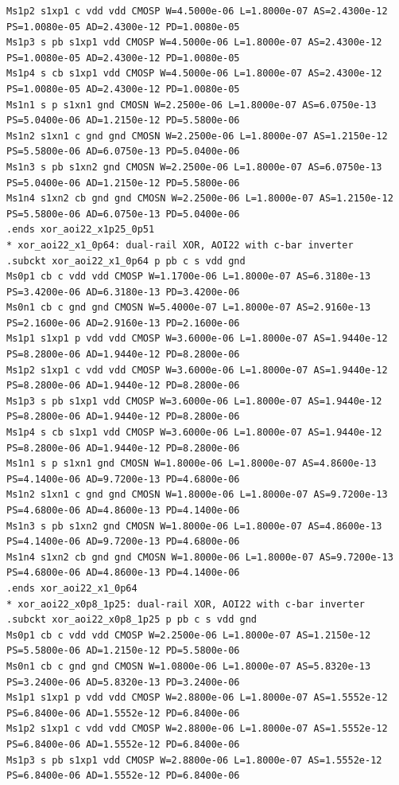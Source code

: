 \documentclass[10pt,a4paper]{article}
\begin{document}
{\begin{verbatim}
Ms1p2 s1xp1 c vdd vdd CMOSP W=4.5000e-06 L=1.8000e-07 AS=2.4300e-12 PS=1.0080e-05 AD=2.4300e-12 PD=1.0080e-05
Ms1p3 s pb s1xp1 vdd CMOSP W=4.5000e-06 L=1.8000e-07 AS=2.4300e-12 PS=1.0080e-05 AD=2.4300e-12 PD=1.0080e-05
Ms1p4 s cb s1xp1 vdd CMOSP W=4.5000e-06 L=1.8000e-07 AS=2.4300e-12 PS=1.0080e-05 AD=2.4300e-12 PD=1.0080e-05
Ms1n1 s p s1xn1 gnd CMOSN W=2.2500e-06 L=1.8000e-07 AS=6.0750e-13 PS=5.0400e-06 AD=1.2150e-12 PD=5.5800e-06
Ms1n2 s1xn1 c gnd gnd CMOSN W=2.2500e-06 L=1.8000e-07 AS=1.2150e-12 PS=5.5800e-06 AD=6.0750e-13 PD=5.0400e-06
Ms1n3 s pb s1xn2 gnd CMOSN W=2.2500e-06 L=1.8000e-07 AS=6.0750e-13 PS=5.0400e-06 AD=1.2150e-12 PD=5.5800e-06
Ms1n4 s1xn2 cb gnd gnd CMOSN W=2.2500e-06 L=1.8000e-07 AS=1.2150e-12 PS=5.5800e-06 AD=6.0750e-13 PD=5.0400e-06
.ends xor_aoi22_x1p25_0p51
* xor_aoi22_x1_0p64: dual-rail XOR, AOI22 with c-bar inverter
.subckt xor_aoi22_x1_0p64 p pb c s vdd gnd
Ms0p1 cb c vdd vdd CMOSP W=1.1700e-06 L=1.8000e-07 AS=6.3180e-13 PS=3.4200e-06 AD=6.3180e-13 PD=3.4200e-06
Ms0n1 cb c gnd gnd CMOSN W=5.4000e-07 L=1.8000e-07 AS=2.9160e-13 PS=2.1600e-06 AD=2.9160e-13 PD=2.1600e-06
Ms1p1 s1xp1 p vdd vdd CMOSP W=3.6000e-06 L=1.8000e-07 AS=1.9440e-12 PS=8.2800e-06 AD=1.9440e-12 PD=8.2800e-06
Ms1p2 s1xp1 c vdd vdd CMOSP W=3.6000e-06 L=1.8000e-07 AS=1.9440e-12 PS=8.2800e-06 AD=1.9440e-12 PD=8.2800e-06
Ms1p3 s pb s1xp1 vdd CMOSP W=3.6000e-06 L=1.8000e-07 AS=1.9440e-12 PS=8.2800e-06 AD=1.9440e-12 PD=8.2800e-06
Ms1p4 s cb s1xp1 vdd CMOSP W=3.6000e-06 L=1.8000e-07 AS=1.9440e-12 PS=8.2800e-06 AD=1.9440e-12 PD=8.2800e-06
Ms1n1 s p s1xn1 gnd CMOSN W=1.8000e-06 L=1.8000e-07 AS=4.8600e-13 PS=4.1400e-06 AD=9.7200e-13 PD=4.6800e-06
Ms1n2 s1xn1 c gnd gnd CMOSN W=1.8000e-06 L=1.8000e-07 AS=9.7200e-13 PS=4.6800e-06 AD=4.8600e-13 PD=4.1400e-06
Ms1n3 s pb s1xn2 gnd CMOSN W=1.8000e-06 L=1.8000e-07 AS=4.8600e-13 PS=4.1400e-06 AD=9.7200e-13 PD=4.6800e-06
Ms1n4 s1xn2 cb gnd gnd CMOSN W=1.8000e-06 L=1.8000e-07 AS=9.7200e-13 PS=4.6800e-06 AD=4.8600e-13 PD=4.1400e-06
.ends xor_aoi22_x1_0p64
* xor_aoi22_x0p8_1p25: dual-rail XOR, AOI22 with c-bar inverter
.subckt xor_aoi22_x0p8_1p25 p pb c s vdd gnd
Ms0p1 cb c vdd vdd CMOSP W=2.2500e-06 L=1.8000e-07 AS=1.2150e-12 PS=5.5800e-06 AD=1.2150e-12 PD=5.5800e-06
Ms0n1 cb c gnd gnd CMOSN W=1.0800e-06 L=1.8000e-07 AS=5.8320e-13 PS=3.2400e-06 AD=5.8320e-13 PD=3.2400e-06
Ms1p1 s1xp1 p vdd vdd CMOSP W=2.8800e-06 L=1.8000e-07 AS=1.5552e-12 PS=6.8400e-06 AD=1.5552e-12 PD=6.8400e-06
Ms1p2 s1xp1 c vdd vdd CMOSP W=2.8800e-06 L=1.8000e-07 AS=1.5552e-12 PS=6.8400e-06 AD=1.5552e-12 PD=6.8400e-06
Ms1p3 s pb s1xp1 vdd CMOSP W=2.8800e-06 L=1.8000e-07 AS=1.5552e-12 PS=6.8400e-06 AD=1.5552e-12 PD=6.8400e-06

\end{verbatim}}
\end{document}
